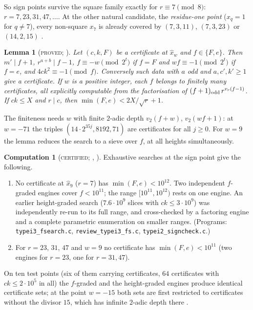 \documentclass[11pt,reqno]{amsart}
\newtheorem{lemma}[theorem]{Lemma}
\theoremstyle{definition}
\newtheorem{computation}[theorem]{Computation}
\newcommand{\status}[1]{\textup{\textsc{#1}}}
\begin{document}
So sign points survive the square family exactly for $r\equiv7\pmod8$:
$r=7,23,31,47,\dots$.  At the other natural candidate, the
\emph{residue-one point} ($x_q=1$ for $q\ne7$), every non-square $x_7$ is
already covered by $(7,3,11)$, $(7,3,23)$ or $(14,2,15)$
\cite[Prop.~2.3]{PT2}.

\begin{lemma}[\status{proved}; {\cite[Lemmas~1.1--1.2]{PT3}}]\label{lem:fgrade}
Let $(c,k,F)$ be a certificate at $\hat x_w$ and $f\in\{F,e\}$.  Then
$m'\mid f+1$, $r^{a+b}\mid f-1$, $f\equiv-w\pmod{2^t}$ if $f=F$ and
$wf\equiv-1\pmod{2^t}$ if $f=e$, and $4ck^2\equiv-1\pmod f$.  Conversely
such data with $a$ odd and $a,c',k'\ge1$ give a certificate.  If $w$ is a
positive integer, each $f$ belongs to finitely many certificates, all
explicitly computable from the factorisation of $(f+1)_{\rm odd}\,r^{v_r(f-1)}$.  If $ck\le X$
and $r\mid c$, then $\min(F,e)<2X/\sqrt r+1$.
\end{lemma}

The finiteness needs $w$ with finite $2$-adic depth $v_2(f+w)$,
$v_2(wf+1)$: at $w=-71$ the triples $(14\cdot2^{35j},8192,71)$ are
certificates for all $j\ge0$.  For $w=9$ the lemma reduces the search to
a sieve over $f$, at all heights simultaneously.

\begin{computation}[\status{certified}; {\cite[Comp.~3.2]{PT2},
\cite[Comp.~2.1, 2.3]{PT3}}]\label{comp:sign}
Exhaustive searches at the sign point give the following.
\begin{enumerate}
\item[(a)] No certificate at $\hat x_9$ ($r=7$) has $\min(F,e)<10^{12}$.
Two independent $f$-graded engines cover $f<10^{11}$; the range
$[10^{11},10^{12})$ rests on one engine.  An earlier height-graded search
($7.6\cdot10^9$ slices with $ck\le3\cdot10^9$) was independently re-run to
its full range, and cross-checked by a factoring engine and a complete
parametric enumeration on smaller ranges.  (Programs:
\texttt{typei3\_fsearch.c}, \texttt{review\_typei3\_fs.c},
\texttt{typei2\_signcheck.c}.)
\item[(b)] For $r=23$, $31$, $47$ and $w=9$ no certificate has
$\min(F,e)<10^{11}$ (two engines for $r=23$, one for $r=31,47$).
\end{enumerate}
On ten test points (six of them carrying certificates, $64$ certificates
with $ck\le2\cdot10^5$ in all) the $f$-graded and the height-graded
engines produce identical certificate sets; at the point $w=-15$ both
sets are first restricted to certificates without the divisor $15$, which
has infinite $2$-adic depth there \cite[\S2]{PT3}.
\end{computation}
\end{document}
